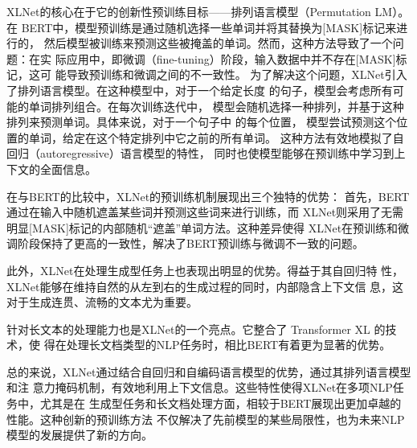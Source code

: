 XLNet的核心在于它的创新性预训练目标——排列语言模型（Permutation LM）。在
BERT中，模型预训练是通过随机选择一些单词并将其替换为[MASK]标记来进行的，
然后模型被训练来预测这些被掩盖的单词。然而，这种方法导致了一个问题：在实
际应用中，即微调（fine-tuning）阶段，输入数据中并不存在[MASK]标记，这可
能导致预训练和微调之间的不一致性。
为了解决这个问题，XLNet引入了排列语言模型。在这种模型中，对于一个给定长度
的句子，模型会考虑所有可能的单词排列组合。在每次训练迭代中，
模型会随机选择一种排列，并基于这种排列来预测单词。具体来说，对于一个句子中
的每个位置，
模型尝试预测这个位置的单词，给定在这个特定排列中它之前的所有单词。
这种方法有效地模拟了自回归（autoregressive）语言模型的特性，
同时也使模型能够在预训练中学习到上下文的全面信息。

在与BERT的比较中，XLNet的预训练机制展现出三个独特的优势：
首先，BERT通过在输入中随机遮盖某些词并预测这些词来进行训练，而
XLNet则采用了无需明显[MASK]标记的内部随机``遮盖''单词方法。这种差异使得
XLNet在预训练和微调阶段保持了更高的一致性，解决了BERT预训练与微调不一致的问题。

此外，XLNet在处理生成型任务上也表现出明显的优势。得益于其自回归特
性，XLNet能够在维持自然的从左到右的生成过程的同时，内部隐含上下文信
息，这对于生成连贯、流畅的文本尤为重要。

针对长文本的处理能力也是XLNet的一个亮点。它整合了
 Transformer XL\cite{dai2019transformer} 的技术，使
得在处理长文档类型的NLP任务时，相比BERT有着更为显著的优势。

总的来说，XLNet通过结合自回归和自编码语言模型的优势，通过其排列语言模型和注
意力掩码机制，有效地利用上下文信息。这些特性使得XLNet在多项NLP任务中，尤其是在
生成型任务和长文档处理方面，相较于BERT展现出更加卓越的性能。这种创新的预训练方法
不仅解决了先前模型的某些局限性，也为未来NLP模型的发展提供了新的方向。



